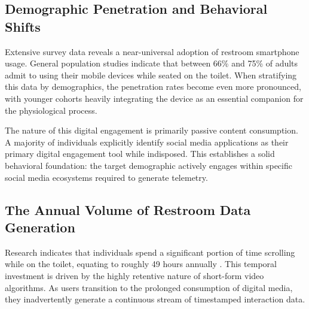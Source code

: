 \documentclass[twocolumn]{article}
\begin{document}
\subsection{Demographic Penetration and Behavioral Shifts}
Extensive survey data reveals a near-universal adoption of restroom smartphone usage. General population studies indicate that between 66\% and 75\% of adults admit to using their mobile devices while seated on the toilet. When stratifying this data by demographics, the penetration rates become even more pronounced, with younger cohorts heavily integrating the device as an essential companion for the physiological process.

The nature of this digital engagement is primarily passive content consumption. A majority of individuals explicitly identify social media applications as their primary digital engagement tool while indisposed. This establishes a solid behavioral foundation: the target demographic actively engages within specific social media ecosystems required to generate telemetry.

\subsection{The Annual Volume of Restroom Data Generation}
Research indicates that individuals spend a significant portion of time scrolling while on the toilet, equating to roughly 49 hours annually \cite{qssupplies}. This temporal investment is driven by the highly retentive nature of short-form video algorithms. As users transition to the prolonged consumption of digital media, they inadvertently generate a continuous stream of timestamped interaction data.

\begin{table}[h!]
	\centering
	\caption{Bathroom Smartphone Usage by Demographic}
\end{table}
\end{document}
